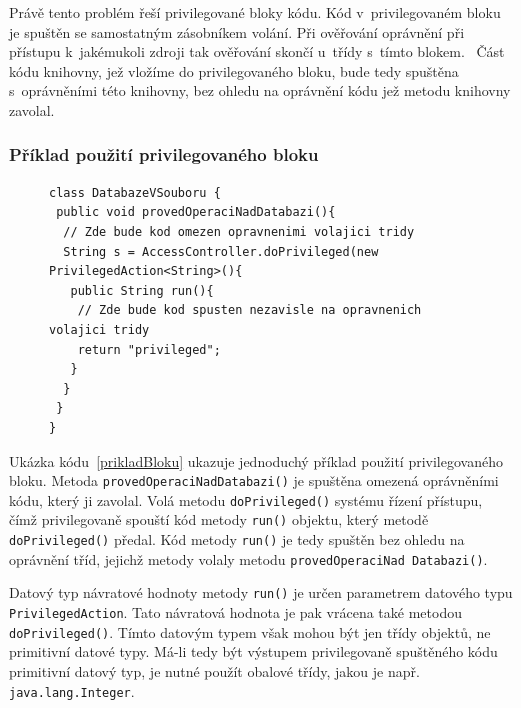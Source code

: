 Právě tento problém řeší privilegované bloky kódu. Kód v~privilegovaném bloku je spuštěn se samostatným zásobníkem volání. Při ověřování oprávnění při přístupu k~jakémukoli zdroji tak ověřování skončí u~třídy s~tímto blokem.~\cite{refAccessController}
Část kódu knihovny, jež vložíme do privilegovaného bloku, bude tedy spuštěna s~oprávněními této knihovny, bez ohledu na oprávnění kódu jež metodu knihovny zavolal.

\pagebreak
\subsubsection{Příklad použití privilegovaného bloku}

\begin{figure}[tbh]
\begin{lstlisting}[caption=Příklad použití privilegovaného bloku~\cite{refAccessController}, label=prikladBloku]
class DatabazeVSouboru {
 public void provedOperaciNadDatabazi(){
  // Zde bude kod omezen opravnenimi volajici tridy
  String s = AccessController.doPrivileged(new PrivilegedAction<String>(){
   public String run(){
    // Zde bude kod spusten nezavisle na opravnenich volajici tridy
    return "privileged";
   }
  }
 }
}
\end{lstlisting}
\end{figure}

Ukázka kódu~\ref{prikladBloku} ukazuje jednoduchý příklad použití privilegovaného bloku.
Metoda {\tt provedOperaciNadDatabazi()} je spuštěna omezená oprávněními kódu, který ji zavolal.
Volá metodu {\tt doPrivileged()} systému řízení přístupu, čímž privilegovaně spouští kód metody {\tt run()} objektu, který metodě {\tt doPrivileged()} předal.
Kód metody {\tt run()} je tedy spuštěn bez ohledu na oprávnění tříd, jejichž metody volaly metodu {\tt provedOperaciNad Databazi()}.

Datový typ návratové hodnoty metody {\tt run()} je určen parametrem datového typu {\tt PrivilegedAction}.
Tato návratová hodnota je pak vrácena také metodou {\tt doPrivileged()}.
Tímto datovým typem však mohou být jen třídy objektů, ne primitivní datové typy.
Má-li tedy být výstupem privilegovaně spuštěného kódu primitivní datový typ, je nutné použít obalové třídy, jakou je např. {\tt java.lang.Integer}.

